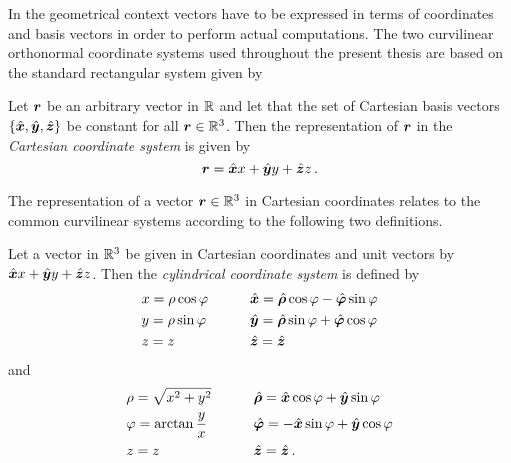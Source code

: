 In the geometrical context vectors have to be expressed in terms of coordinates
and basis vectors in order to perform actual computations.
The two curvilinear orthonormal coordinate systems used throughout the present
thesis are based on the standard rectangular system given by
\begin{definition}
	Let $\pvec{r}$ be an arbitrary vector in $\mathbb{R}$ and let that the set of
	Cartesian basis vectors $\left\{\uv{x}, \uv{y}, \uv{z}\right\}$ be 
	constant for all $\pvec{r} \in \R^3$.
	Then the representation of $\pvec{r}$ in the \emph{Cartesian coordinate
	system} is given by
	\begin{equation}
		\pvec{r} = \uv{x}x + \uv{y}y + \uv{z}z
		\, .
	\end{equation}
\end{definition}
The representation of a vector $\pvec{r} \in \R^3$ in Cartesian coordinates
relates to the common curvilinear systems according to the following two
definitions.
\begin{definition}
	\label{def:cyl_coords}
	Let a vector in $\mathbb{R}^3$ be given in Cartesian coordinates and unit vectors
	by $\uv{x}x + \uv{y}y + \uv{z}z$.
	Then the \emph{cylindrical coordinate system} is defined by 
	\begin{subequations}
		\begin{align}
			&x = \rho \cos \varphi
			\qquad
			&&\uv{x} = \uv{\rho} \cos \varphi - \uv{\varphi}\sin \varphi \\
			&y = \rho \sin \varphi 
			\qquad
			&&\uv{y} = \uv{\rho} \sin \varphi + \uv{\varphi} \cos \varphi\\
			&z = z 
			\qquad
			&&\uv{z} = \uv{z} 
		\end{align}
	\end{subequations}
	and
	\begin{subequations}
		\begin{align}
			&\rho = \sqrt{x^2 + y^2}
			\qquad
			&& \uv{\rho} = \uv{x} \cos \varphi + \uv{y} \sin \varphi \\
			&\varphi = \arctan \frac{y}{x}
			\qquad
			&&\uv{\varphi} = -\uv{x} \sin \varphi + \uv{y} \cos \varphi \\
			&z = z
			\qquad
			&&\uv{z} = \uv{z} \, .
		\end{align}
	\end{subequations}
\end{definition}

